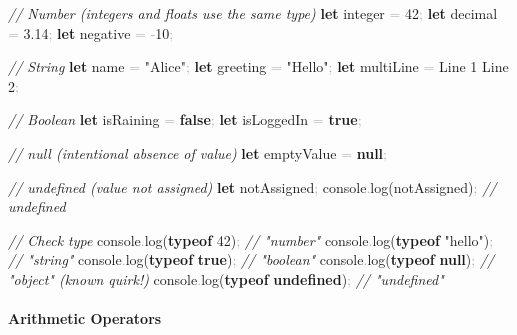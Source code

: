 \documentclass[
  justified,
  openright,
]{tufte-book}
\let\subsection\paragraph
\let\paragraph\paragraph
\newcommand{\KeywordTok}[1]{\textcolor{CodeKeyword}{\textbf{#1}}}  %
\newcommand{\StringTok}[1]{\textcolor{CodeString}{#1}}              %
\newcommand{\CommentTok}[1]{\textcolor{CodeComment}{\textit{#1}}}  %
\newcommand{\CodeNumTok}[1]{\textcolor{CodeNumber}{#1}}             %
\newcommand{\CodeFuncTok}[1]{\textcolor{CodeKeyword}{#1}}           %
\newcommand{\OperatorTok}[1]{\textcolor{DarkGray}{#1}}              %
\newenvironment{Shaded}{%
  \begin{mdframed}[style=TufteCode]%
}{%
  \end{mdframed}%
}
\let\subsection\paragraph
\let\paragraph\paragraph
\begin{document}
\begin{Shaded}
\begin{Highlighting}[]
\CommentTok{// Number (integers and floats use the same type)}
\KeywordTok{let} integer \OperatorTok{=} \CodeNumTok{42}\OperatorTok{;}
\KeywordTok{let} decimal \OperatorTok{=} \CodeNumTok{3.14}\OperatorTok{;}
\KeywordTok{let} negative \OperatorTok{=} \OperatorTok{{-}}\CodeNumTok{10}\OperatorTok{;}
 
\CommentTok{// String}
\KeywordTok{let} name \OperatorTok{=} \StringTok{"Alice"}\OperatorTok{;}
\KeywordTok{let} greeting \OperatorTok{=} \StringTok{"Hello"}\OperatorTok{;}
\KeywordTok{let} multiLine \OperatorTok{=} \StringTok{\textasciigrave{}Line 1}
\StringTok{Line 2\textasciigrave{}}\OperatorTok{;}
 
\CommentTok{// Boolean}
\KeywordTok{let} isRaining \OperatorTok{=} \KeywordTok{false}\OperatorTok{;}
\KeywordTok{let} isLoggedIn \OperatorTok{=} \KeywordTok{true}\OperatorTok{;}
 
\CommentTok{// null (intentional absence of value)}
\KeywordTok{let} emptyValue \OperatorTok{=} \KeywordTok{null}\OperatorTok{;}
 
\CommentTok{// undefined (value not assigned)}
\KeywordTok{let} notAssigned\OperatorTok{;}
console\OperatorTok{.}\CodeFuncTok{log}(notAssigned)\OperatorTok{;} \CommentTok{// undefined}
 
\CommentTok{// Check type}
console\OperatorTok{.}\CodeFuncTok{log}(\KeywordTok{typeof} \CodeNumTok{42})\OperatorTok{;} \CommentTok{// "number"}
console\OperatorTok{.}\CodeFuncTok{log}(\KeywordTok{typeof} \StringTok{"hello"})\OperatorTok{;} \CommentTok{// "string"}
console\OperatorTok{.}\CodeFuncTok{log}(\KeywordTok{typeof} \KeywordTok{true})\OperatorTok{;} \CommentTok{// "boolean"}
console\OperatorTok{.}\CodeFuncTok{log}(\KeywordTok{typeof} \KeywordTok{null})\OperatorTok{;} \CommentTok{// "object" (known quirk!)}
console\OperatorTok{.}\CodeFuncTok{log}(\KeywordTok{typeof} \KeywordTok{undefined})\OperatorTok{;} \CommentTok{// "undefined"}
\end{Highlighting}
\end{Shaded}

\subsection{Arithmetic Operators}\label{arithmetic-operators}
\end{document}

